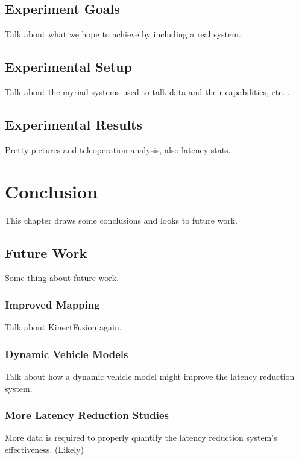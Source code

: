 \documentclass[12pt]{report}
\begin{document}
\section{Experiment Goals}
Talk about what we hope to achieve by including a real system.

\section{Experimental Setup}\label{sec:experimental_setup}
Talk about the myriad systems used to talk data and their capabilities, etc...

\section{Experimental Results}
Pretty pictures and teleoperation analysis, also latency stats.


\chapter{Conclusion}\label{chap:conclusion}
This chapter draws some conclusions and looks to future work.

\section{Future Work}
Some thing about future work.

\subsection{Improved Mapping}
Talk about KinectFusion again.

\subsection{Dynamic Vehicle Models}
Talk about how a dynamic vehicle model might improve the latency reduction system.

\subsection{More Latency Reduction Studies}
More data is required to properly quantify the latency reduction system's effectiveness.  (Likely)

\end{document}
